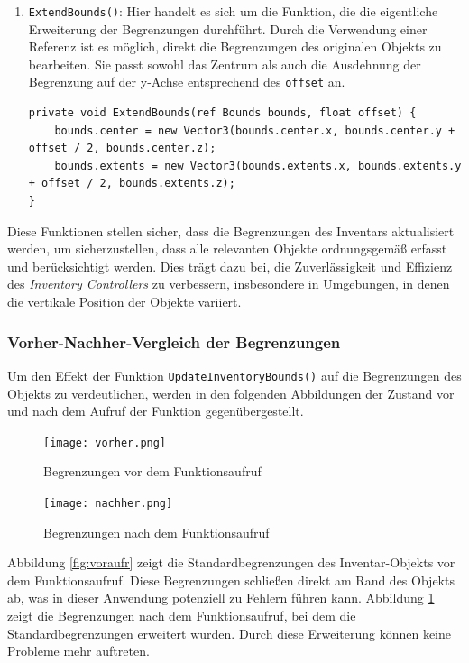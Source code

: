 \begin{itemize}
\begin{enumerate}
\item \texttt{ExtendBounds()}: Hier handelt es sich um die Funktion, die die eigentliche Erweiterung der Begrenzungen
durchführt. Durch die Verwendung einer Referenz ist es möglich, direkt die Begrenzungen des originalen Objekts zu
bearbeiten. Sie passt sowohl das Zentrum als auch die Ausdehnung der Begrenzung auf der y-Achse entsprechend des \texttt{offset} an.
\begin{lstlisting}[language={[Sharp]C}]
private void ExtendBounds(ref Bounds bounds, float offset) {
    bounds.center = new Vector3(bounds.center.x, bounds.center.y + offset / 2, bounds.center.z);
    bounds.extents = new Vector3(bounds.extents.x, bounds.extents.y + offset / 2, bounds.extents.z);
}
\end{lstlisting}
\end{enumerate}

Diese Funktionen stellen sicher, dass die Begrenzungen des Inventars aktualisiert werden, um sicherzustellen, dass alle
relevanten Objekte ordnungsgemäß erfasst und berücksichtigt werden. Dies trägt dazu bei, die Zuverlässigkeit und Effizienz
des \textit{Inventory Controllers} zu verbessern, insbesondere in Umgebungen, in denen die vertikale Position der Objekte
variiert.

\subsubsection*{Vorher-Nachher-Vergleich der Begrenzungen}
Um den Effekt der Funktion \texttt{UpdateInventoryBounds()} auf die Begrenzungen des Objekts zu verdeutlichen, werden
in den folgenden Abbildungen der Zustand vor und nach dem Aufruf der Funktion gegenübergestellt.

\begin{figure}[H]
    \centering
    \begin{minipage}[b]{0.45\textwidth}
        \centering
        \texttt{[image: vorher.png]}
        \caption{Begrenzungen vor dem Funktionsaufruf}
        \label{fig:voraufr}
    \end{minipage}
    \hfill
    \begin{minipage}[b]{0.45\textwidth}
        \centering
        \texttt{[image: nachher.png]}
        \caption{Begrenzungen nach dem Funktionsaufruf}
        \label{fig:nachaufr}
    \end{minipage}
\end{figure}

Abbildung \ref{fig:voraufr} zeigt die Standardbegrenzungen des Inventar-Objekts vor dem Funktionsaufruf. Diese Begrenzungen
schließen direkt am Rand des Objekts ab, was in dieser Anwendung potenziell zu Fehlern führen kann. Abbildung \ref{fig:nachaufr}
zeigt die Begrenzungen nach dem Funktionsaufruf, bei dem die Standardbegrenzungen erweitert wurden. Durch diese Erweiterung
können keine Probleme mehr auftreten.


\end{itemize}
